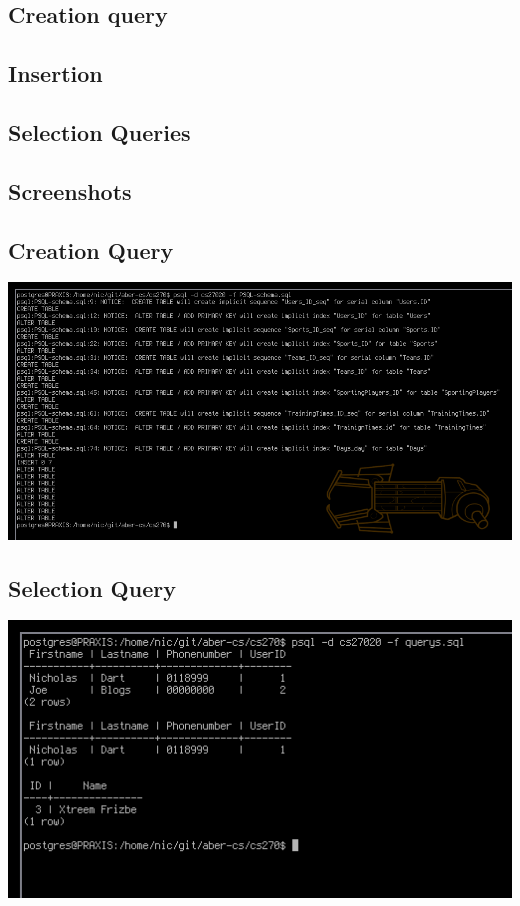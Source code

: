 \documentclass[10pt]{article}
\begin{document}
            \subsection{Creation query}
                

            \subsection{Insertion}
                

            \subsection{Selection Queries}
                
                    
        \begin{landscape}
            \section{Screenshots}
                \subsection{Creation Query}
                    \begin{center}
                        \includegraphics[scale=0.75]{createQuery_cropped.png}
                    \end{center}
        \end{landscape}
            \subsection{Selection Query}
                \begin{center}
                    \includegraphics[scale=0.75]{selectionQuery_cropped.png}
                \end{center}
\end{document}
